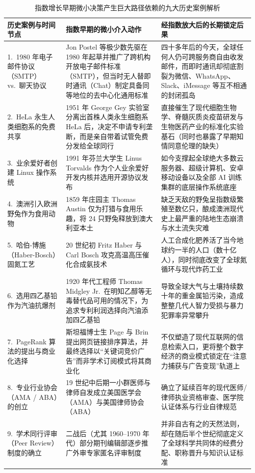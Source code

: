 \documentclass[a4paper]{article}
\begin{document}
\begin{table}[H]
\centering
\small
\caption{指数增长早期微小决策产生巨大路径依赖的九大历史案例解析}
\begin{tabular}{p{3.4cm}p{4.6cm}p{5.6cm}}
\toprule
\textbf{历史案例与时间节点} & \textbf{指数早期的微小介入动作} & \textbf{经指数放大后的长期锁定后果} \\
\midrule
1.\ 1980 年电子邮件协议（SMTP）vs.\ 聊天协议 & Jon Postel 等极少数先驱在 1980 年起草并推广了跨机构开放电子邮件标准（SMTP），但当时无人替即时通讯（Chat）制定具备同等地位的去中心化通用标准 & 四十多年后的今天，全球任何人仍可跨服务商自由收发邮件，而即时通讯却彻底割裂为微信、WhatsApp、Slack、iMessage 等互不相通的封闭孤岛 \\
2.\ HeLa 永生人类细胞系的免费共享 & 1951 年 George Gey 实验室分离出首株人类永生细胞系 HeLa 后，决定不申请专利垄断，而是亲自带着试管免费分发给全球同行 & 直接催生了现代细胞生物学、脊髓灰质炎疫苗研发与生物医药产业的标准化实验基石（同时也暴露了早期知情同意伦理的缺失） \\
3.\ 业余爱好者创建 Linux 操作系统 & 1991 年芬兰大学生 Linus Torvalds 作为个人业余爱好开发内核并选用开源协议发布 & 如今支撑起全球绝大多数云服务器、超级计算机、安卓移动设备以及全部 AI 训练集群的底层操作系统底座 \\
4.\ 澳洲引入欧洲野兔作为食用动物 & 1859 年庄园主 Thomas Austin 仅为打猎与食用乐趣，将 24 只野兔释放到澳大利亚本土 & 缺乏天敌的野兔呈指数级繁殖至数亿只，酿成澳洲现代史上最严重的陆地生态崩溃与水土流失灾难 \\
5.\ 哈伯-博施（Haber-Bosch）固氮工艺 & 20 世纪初 Fritz Haber 与 Carl Bosch 攻克高温高压催化合成氨技术 & 人工合成化肥养活了当今地球约一半的人口（数十亿人），同时彻底改变了全球氮循环与现代炸药工业 \\
6.\ 选用四乙基铅作为汽油抗爆剂 & 1920 年代工程师 Thomas Midgley Jr.\ 在明知乙醇等无毒替代品可用的情况下，为追求专利利润选择向汽油添加四乙基铅 & 导致全球大气与土壤持续数十年的重金属铅污染，造成整整几代人智力受损与暴力犯罪率异常攀升 \\
7.\ PageRank 算法的提出与商业化选择 & 斯坦福博士生 Page 与 Brin 提出网页链接排序算法，并最终选择以“关键词竞价广告”而非学术订阅模式将其商业化 & 不仅塑造了现代互联网的信息检索入口，更将整个数字经济的商业模式锁定在“注意力捕获与广告变现”轨道上 \\
8.\ 专业行业协会（AMA / ABA）的创立 & 19 世纪中后期一小群医师与律师自发成立美国医学会（AMA）与美国律师协会（ABA） & 确立了延续百年的现代医师/律师执业资格审查、医学院认证体系与行业自律规范 \\
9.\ 学术同行评审（Peer Review）制度的确立 & 二战后（尤其 1960--1970 年代）部分期刊编辑部逐步推广外审专家匿名评审制度 & 并非自古有之的天然法则，却在随后半个世纪彻底定义了全球科学共同体的经费分配、职称晋升与知识认证标准 \\
\bottomrule
\end{tabular}
\end{table}
\end{document}
